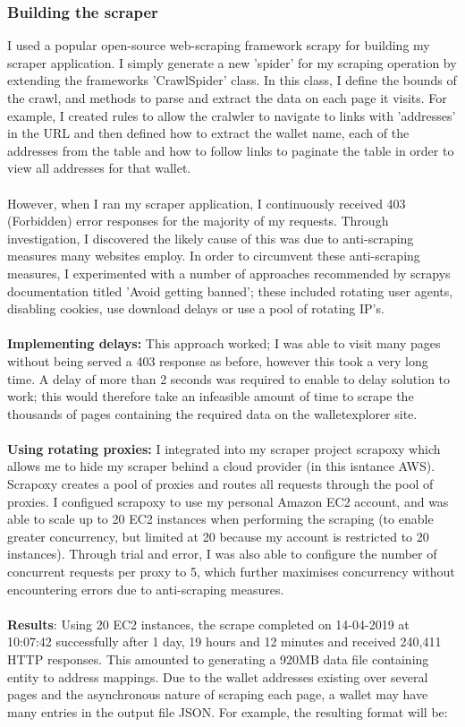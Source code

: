 \subsubsection{Building the scraper}
I used a popular open-source web-scraping framework scrapy for building my scraper application. I simply generate a new 'spider' for my scraping operation by extending the frameworks 'CrawlSpider' class. In this class, I define the bounds of the crawl, and methods to parse and extract the data on each page it visits. For example, I created rules to allow the cralwler to navigate to links with 'addresses' in the URL and then defined how to extract the wallet name,  each of the addresses from the table and how to follow links to paginate the table in order to view all addresses for that wallet. 
\\\\
However, when I ran my scraper application, I continuously received 403 (Forbidden) error responses for the majority of my requests.  Through investigation, I discovered the likely cause of this was due to anti-scraping measures many websites employ. In order to circumvent these anti-scraping measures, I experimented with a number of approaches recommended by scrapys documentation titled 'Avoid getting banned'; these included rotating user agents, disabling cookies, use download delays or use a pool of rotating IP's. 
\\\\
\textbf{Implementing delays:} This approach worked; I was able to visit many pages without being served a 403 response as before, however this took a very long time. A delay of more than 2 seconds was required to enable to delay solution to work; this would therefore take an infeasible amount of time to scrape the thousands of pages containing the required data on the walletexplorer site. 
\\\\
\textbf{Using rotating proxies:} I integrated into my scraper project scrapoxy which allows me to hide my scraper behind a cloud provider (in this isntance AWS). Scrapoxy creates a pool of proxies and routes all requests through the pool of proxies. I configued scrapoxy to use my personal Amazon EC2 account, and was able to scale up to 20 EC2 instances when performing the scraping (to enable greater concurrency, but limited at 20 because my account is restricted to 20 instances).  Through trial and error, I was also able to configure the number of concurrent requests per proxy to 5, which further maximises concurrency without encountering errors due to anti-scraping measures. 
\\\\
\textbf{Results}: Using 20 EC2 instances, the scrape completed on 14-04-2019 at 10:07:42 successfully after 1 day, 19 hours and 12 minutes and received 240,411 HTTP responses. This amounted to generating a 920MB data file containing entity to address mappings. Due to the wallet addresses existing over several pages and the asynchronous nature of scraping each page, a wallet may have many entries in the output file JSON. For example, the resulting format will be:

